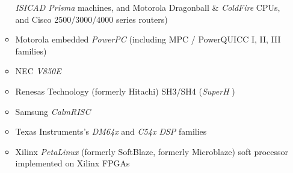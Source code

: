 \begin{latin}
\begin{itemize}
\begin{itemize}
			\emph{ISICAD Prisma}  machines, and Motorola Dragonball \& 
			\emph{ColdFire}  CPUs, and Cisco 2500/3000/4000 series routers)
		\item Motorola embedded \emph{PowerPC} 
			(including MPC / PowerQUICC I, II, III families)
		\item NEC \emph{V850E} 
		\item Renesas Technology (formerly Hitachi) SH3/SH4 (\emph{SuperH} )
		\item Samsung \emph{CalmRISC} 
		\item Texas Instruments's 
		\emph{DM64x} 
			and \emph{C54x DSP}  families
		\item Xilinx \emph{PetaLinux} 
			(formerly SoftBlaze, formerly Microblaze) soft processor implemented on Xilinx FPGAs
	\end{itemize}


\end{itemize}
\end{latin}
